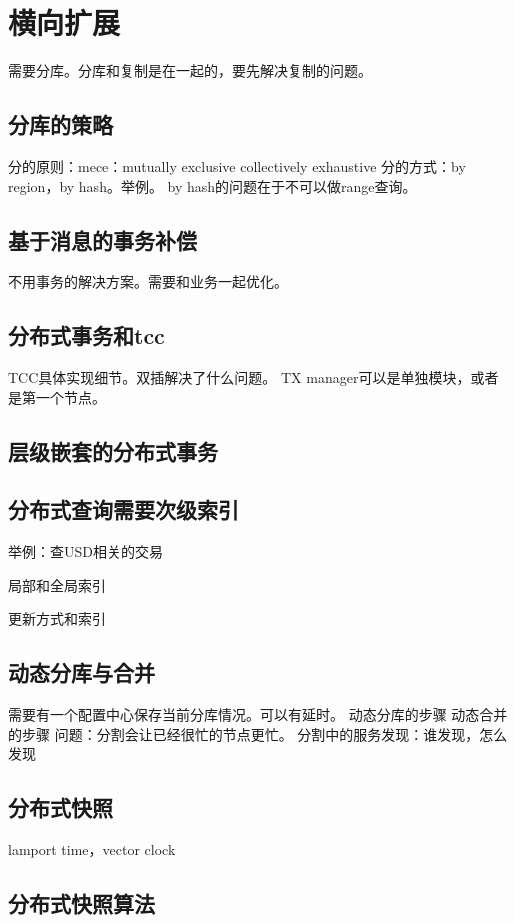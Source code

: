\chapter{横向扩展}


需要分库。分库和复制是在一起的，要先解决复制的问题。

\section{分库的策略}
分的原则：mece：mutually exclusive collectively exhaustive
分的方式：by region，by hash。举例。
by hash的问题在于不可以做range查询。

\section{基于消息的事务补偿}
不用事务的解决方案。需要和业务一起优化。

\section{分布式事务和tcc}
TCC具体实现细节。双插解决了什么问题。
TX manager可以是单独模块，或者是第一个节点。

\section{层级嵌套的分布式事务}

\section{分布式查询需要次级索引}
举例：查USD相关的交易

局部和全局索引

更新方式和索引

\section{动态分库与合并}
需要有一个配置中心保存当前分库情况。可以有延时。
动态分库的步骤
动态合并的步骤
问题：分割会让已经很忙的节点更忙。
分割中的服务发现：谁发现，怎么发现

\section{分布式快照}





lamport time，vector clock

\section{分布式快照算法}
